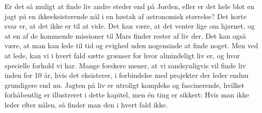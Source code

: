 
Er det så muligt at finde liv andre steder end på Jorden, eller er det hele blot en jagt på en ikkeeksisterende nål i en høstak af astronomisk størrelse? Det korte svar er, at det ikke er til at vide. Det kan være, at det venter lige om hjørnet, og at en af de kommende missioner til Mars finder rester af liv der. Det kan også være, at man kan lede til tid og evighed uden nogensinde at finde noget. Men ved at lede, kan vi i hvert fald sætte grænser for hvor almindeligt liv er, og hvor specielle forhold vi har. Mange forskere mener, at vi sandsynligvis vil finde liv inden for 10 år, hvis det eksisterer, i forbindelse med projekter der leder endnu grundigere end nu.
Jagten på liv er utroligt kompleks og fascinerende, hvilket forhåbentlig er illustreret i dette kapitel, men én ting er sikkert: Hvis man ikke leder efter nålen, så finder man den i hvert fald ikke.
